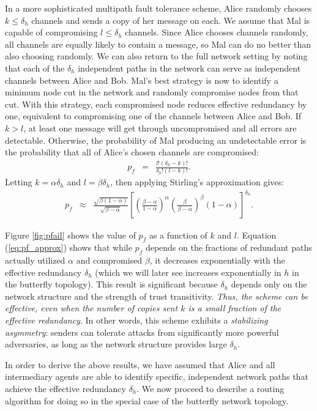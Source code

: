 \documentclass{sig-alternate-05-2015}
\newcommand{\beq}{\begin{eqnarray}}
\newcommand{\eeq}{\end{eqnarray}}
\begin{document}
In a more sophisticated multipath fault tolerance scheme,
Alice randomly chooses $k \leq \delta_h$ channels and sends a copy of
her message on each.
We assume that Mal is capable of compromising $l \leq \delta_h$ channels.
Since Alice chooses channels randomly,
all channels are equally likely to contain a message,
so Mal can do no better than also choosing randomly.
We can also return to the full network setting by noting that each of the
$\delta_h$ independent paths in the network can serve as independent channels
between Alice and Bob.
Mal's best strategy is now to identify a minimum node cut in the network
and randomly compromise nodes from that cut.
With this strategy, each compromised node reduces effective redundancy by one,
equivalent to compromising one of the channels between Alice and Bob.
If $k > l$, at least one message will get through uncompromised and all
errors are detectable.
Otherwise, the probability of Mal producing an undetectable error is
the probability that all of Alice's chosen channels are compromised:
\beq
\label{eq:pf}
p_f &=& \frac{l!(\delta_h-k)!}{\delta_h!(l-k)!}.
\eeq
Letting $k=\alpha \delta_h$ and $l=\beta \delta_h$, then applying Stirling's
approximation gives:
\begin{eqnarray}
\label{eq:pf_approx}
p_f &\approx&
\frac{\sqrt{\beta(1-\alpha)}}{\sqrt{\beta-\alpha}}
\left[
    \left( \frac{\beta-\alpha}{1-\alpha} \right)^{\alpha}
    \left( \frac{\beta}{\beta-\alpha} \right)^{\beta}
    (1-\alpha)
\right]^{\delta_h}.
\end{eqnarray}

Figure \ref{fig:pfail} shows the value of $p_f$
as a function of $k$ and $l$.
Equation (\ref{eq:pf_approx}) shows that while $p_f$
depends on the fractions of
redundant paths actually utilized $\alpha$ and compromised $\beta$,
it decreases exponentially with the effective redundancy $\delta_h$
(which we will later see increases exponentially in $h$ in the
butterfly topology).
This result is significant because $\delta_h$
depends only on the network structure
and the strength of trust transitivity.
{\em Thus, the scheme can be effective, even when the number of copies
sent $k$ is a small fraction of the effective redundancy}.
In other words, this scheme exhibits a {\em stabilizing asymmetry}:
senders can tolerate attacks from significantly more powerful
adversaries,
as long as the network structure provides large $\delta_h$.

In order to derive the above results,
we have assumed that Alice and all
intermediary agents are able to identify specific,
independent network paths that achieve the effective redundancy $\delta_h$.
We now proceed to describe a routing algorithm for doing so in the special case
of the butterfly network topology.
\end{document}
